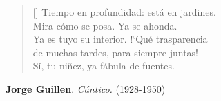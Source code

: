 

\settowidth{\versewidth}{Ya es tuyo su interior. !`Qué trasparencia}

\bigskip

\begin{verse}[\versewidth]
Tiempo en profundidad: está en jardines. \\
Mira cómo se posa. Ya se ahonda. \\
Ya es tuyo su interior. !`Qué trasparencia \\
de muchas tardes, para siempre juntas! \\
Sí, tu niñez, ya fábula de fuentes.
\end{verse}

\bigskip \bigskip \bigskip

\hspace*{20mm} {\bf Jorge Guillen}. {\em Cántico.} (1928-1950)
